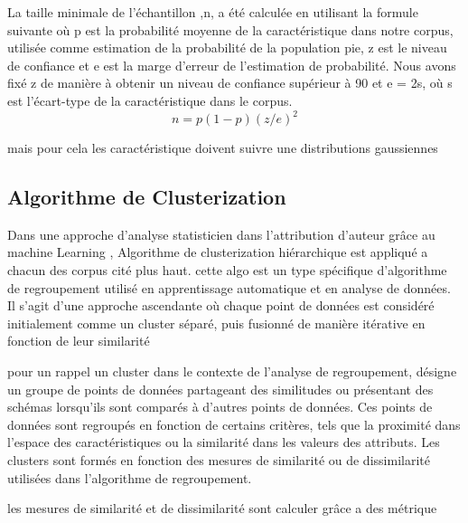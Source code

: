 \documentclass[]{report}
\begin{document}
La taille minimale de l'échantillon ,n, a été calculée en utilisant la formule
suivante où p est la probabilité moyenne de la caractéristique dans notre
corpus, utilisée comme estimation de la probabilité de la population pie, z est
le niveau de confiance et e est la marge d'erreur de l'estimation de
probabilité.  Nous avons fixé z de manière à obtenir un niveau de confiance
supérieur à 90 et e = 2s, où s est l'écart-type de la caractéristique dans le
corpus.
\[n=p(1-p)(z/e)^2\]

mais pour cela les caractéristique doivent suivre une distributions gaussiennes
\subsection{ Algorithme de Clusterization}

Dans une approche d'analyse statisticien dans l’attribution d’auteur grâce au
machine Learning , Algorithme de clusterization hiérarchique est appliqué a
chacun des corpus cité plus haut.  cette algo est un type spécifique
d'algorithme de regroupement utilisé en apprentissage automatique et en analyse
de données. Il s'agit d'une approche ascendante où chaque point de données est
considéré initialement comme un cluster séparé, puis fusionné de manière
itérative en fonction de leur similarité

pour un rappel un cluster dans le contexte de l'analyse de regroupement, désigne
un groupe de points de données partageant des similitudes ou présentant des
schémas lorsqu'ils sont comparés à d'autres points de données. Ces points de
données sont regroupés en fonction de certains critères, tels que la proximité
dans l'espace des caractéristiques ou la similarité dans les valeurs des
attributs. Les clusters sont formés en fonction des mesures de similarité ou de
dissimilarité utilisées dans l'algorithme de regroupement.

les mesures de similarité et de dissimilarité sont calculer grâce a des métrique
\end{document}
